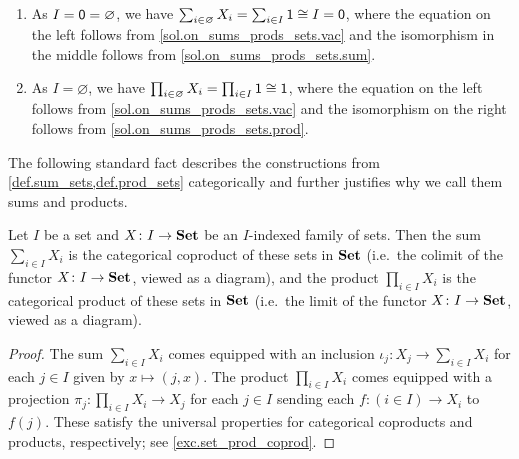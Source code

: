 \documentclass[Book-Poly]{subfiles}
\begin{document}
\begin{exercise}
\begin{solution}
\begin{enumerate}
            \item As $I = \textsf{0} = \varnothing$, we have $\sum_{i\in\varnothing}X_i = \sum_{i\in I}\textsf{1} \cong I = \textsf{0}$, where the equation on the left follows from \cref{sol.on_sums_prods_sets.vac} and the isomorphism in the middle follows from \cref{sol.on_sums_prods_sets.sum}.

            \item As $I = \varnothing$, we have $\prod_{i\in\varnothing}X_i = \prod_{i\in I}\textsf{1} \cong \textsf{1}$, where the equation on the left follows from \cref{sol.on_sums_prods_sets.vac} and the isomorphism on the right follows from \cref{sol.on_sums_prods_sets.prod}.
        \end{enumerate}
    \end{solution}
\end{exercise}

The following standard fact describes the constructions from \cref{def.sum_sets,def.prod_sets} categorically and further justifies why we call them sums and products.

\begin{proposition} \label{prop.set_prod_coprod}
    Let $I$ be a set and $X\colon I\to\mathbf{Set}$ be an $I$-indexed family of sets. Then the sum $\sum_{i\in I}X_i$ is the categorical coproduct of these sets in $\mathbf{Set}$ (i.e.\ the colimit of the functor $X\colon I\to\mathbf{Set}$, viewed as a diagram), and the product $\prod_{i\in I}X_i$ is the categorical product of these sets in $\mathbf{Set}$ (i.e.\ the limit of the functor $X\colon I\to\mathbf{Set}$, viewed as a diagram).
\end{proposition}

\begin{proof}
    The sum $\sum_{i\in I}X_i$ comes equipped with an inclusion $\iota_j\colon X_j\to\sum_{i\in I}X_i$ for each $j\in I$ given by $x\mapsto(j,x)$.
    The product $\prod_{i\in I}X_i$ comes equipped with a projection $\pi_j\colon\prod_{i\in I}X_i\to X_j$ for each $j\in I$ sending each $f\colon(i\in I)\to X_i$ to $f(j)$.
    These satisfy the universal properties for categorical coproducts and products, respectively; see \cref{exc.set_prod_coprod}.
\end{proof}
\end{document}
